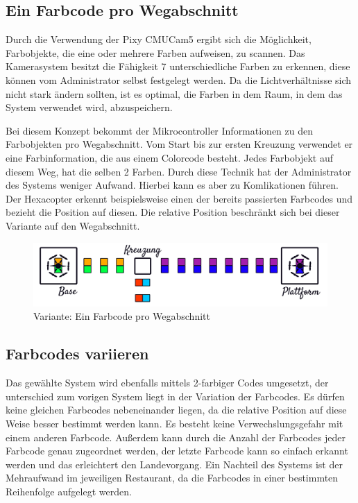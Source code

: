   \subsection*{Ein Farbcode pro Wegabschnitt}
  Durch die Verwendung der Pixy CMUCam5 ergibt sich die Möglichkeit, Farbobjekte, die eine oder mehrere Farben aufweisen, zu scannen.
  Das Kamerasystem besitzt die Fähigkeit 7 unterschiedliche Farben zu erkennen, diese können vom Administrator selbst festgelegt werden. Da die Lichtverhältnisse sich nicht stark ändern sollten, ist es optimal, die Farben in dem Raum, in dem das System verwendet wird, abzuspeichern.

  Bei diesem Konzept bekommt der Mikrocontroller Informationen zu den Farbobjekten pro Wegabschnitt. Vom Start bis zur ersten Kreuzung verwendet er eine Farbinformation, die aus einem Colorcode besteht. Jedes Farbobjekt auf diesem Weg, hat die selben 2 Farben. Durch diese Technik hat der Administrator des Systems weniger Aufwand. Hierbei kann es aber zu Komlikationen führen. Der Hexacopter erkennt beispielsweise einen der bereits passierten Farbcodes und bezieht die Position auf diesen. Die relative Position beschränkt sich bei dieser Variante auf den Wegabschnitt.

    \begin{figure}[H]
      \begin{centering}
        \includegraphics[width = \textwidth]{Bilder/bor_var1}
      \par\end{centering}
      \caption{Variante: Ein Farbcode pro Wegabschnitt}
      \label{Variante1}
    \end{figure}

  \subsection*{Farbcodes variieren}
  Das gewählte System wird ebenfalls mittels 2-farbiger Codes umgesetzt, der unterschied zum vorigen System liegt in der Variation der Farbcodes. Es dürfen keine gleichen Farbcodes nebeneinander liegen, da die relative Position auf diese Weise besser bestimmt werden kann. Es besteht keine Verwechslungsgefahr mit einem anderen Farbcode. Außerdem kann durch die Anzahl der Farbcodes jeder Farbcode genau zugeordnet werden, der letzte Farbcode kann so einfach erkannt werden und das erleichtert den Landevorgang.
  Ein Nachteil des Systems ist der Mehraufwand im jeweiligen Restaurant, da die Farbcodes in einer bestimmten Reihenfolge aufgelegt werden.

